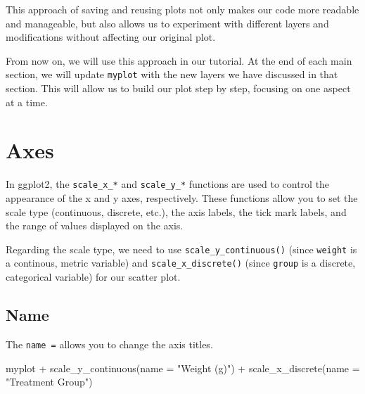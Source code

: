 \documentclass[
  letterpaper,
  DIV=11,
  numbers=noendperiod]{scrartcl}
\newenvironment{Shaded}{\begin{snugshade}}{\end{snugshade}}
\newcommand{\AttributeTok}[1]{\textcolor[rgb]{0.40,0.45,0.13}{#1}}
\newcommand{\FunctionTok}[1]{\textcolor[rgb]{0.28,0.35,0.67}{#1}}
\newcommand{\NormalTok}[1]{\textcolor[rgb]{0.00,0.23,0.31}{#1}}
\newcommand{\SpecialCharTok}[1]{\textcolor[rgb]{0.37,0.37,0.37}{#1}}
\newcommand{\StringTok}[1]{\textcolor[rgb]{0.13,0.47,0.30}{#1}}
\begin{document}
This approach of saving and reusing plots not only makes our code more
readable and manageable, but also allows us to experiment with different
layers and modifications without affecting our original plot.

From now on, we will use this approach in our tutorial. At the end of
each main section, we will update \texttt{myplot} with the new layers we
have discussed in that section. This will allow us to build our plot
step by step, focusing on one aspect at a time.

\hypertarget{axes}{%
\section{Axes}\label{axes}}

In ggplot2, the \texttt{scale\_x\_*} and \texttt{scale\_y\_*} functions
are used to control the appearance of the x and y axes, respectively.
These functions allow you to set the scale type (continuous, discrete,
etc.), the axis labels, the tick mark labels, and the range of values
displayed on the axis.

Regarding the scale type, we need to use \texttt{scale\_y\_continuous()}
(since \texttt{weight} is a continous, metric variable) and
\texttt{scale\_x\_discrete()} (since \texttt{group} is a discrete,
categorical variable) for our scatter plot.

\hypertarget{name}{%
\subsection{Name}\label{name}}

The \texttt{name\ =} allows you to change the axis titles.

\begin{Shaded}
\begin{Highlighting}[]
\NormalTok{myplot }\SpecialCharTok{+}
  \FunctionTok{scale\_y\_continuous}\NormalTok{(}\AttributeTok{name =} \StringTok{"Weight (g)"}\NormalTok{) }\SpecialCharTok{+}
  \FunctionTok{scale\_x\_discrete}\NormalTok{(}\AttributeTok{name =} \StringTok{"Treatment Group"}\NormalTok{)}
\end{Highlighting}
\end{Shaded}
\end{document}
